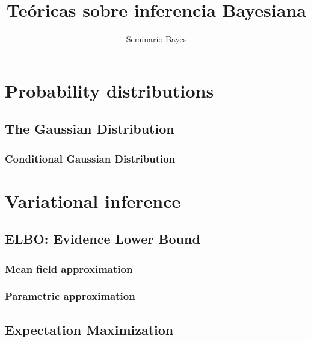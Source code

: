\documentclass[a4paper,10pt]{book}
\title{Te\'oricas sobre inferencia Bayesiana}
\author{Seminario Bayes}
\begin{document}
\maketitle

\chapter{Probability distributions}

\section{The Gaussian Distribution}



\subsection{Conditional Gaussian Distribution}



\chapter{Variational inference}

\section{ELBO: Evidence Lower Bound}



\subsection{Mean field approximation}



\subsection{Parametric approximation}



\section{Expectation Maximization}


\end{document}
